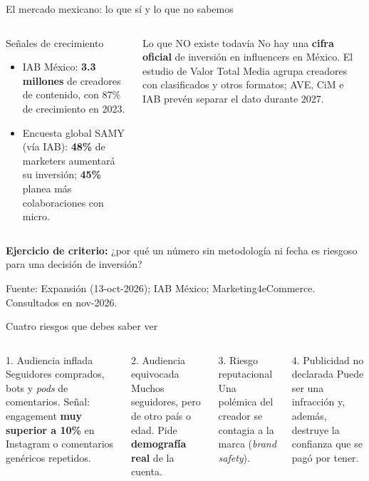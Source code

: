 \documentclass[aspectratio=169,xcolor=dvipsnames]{beamer}
\newcommand{\fuente}[1]{{\tiny\color{IPNgris}Fuente: #1}}
\begin{document}
\begin{frame}{El mercado mexicano: lo que sí y lo que no sabemos}
\begin{columns}[T]
  \begin{block}{Señales de crecimiento}
    \small
    \begin{itemize}
      \item IAB México: \textbf{3.3 millones} de creadores de contenido, con 87\% de crecimiento en 2023.
      \item Encuesta global SAMY (vía IAB): \textbf{48\%} de marketers aumentará su inversión; \textbf{45\%} planea más colaboraciones con micro.
    \end{itemize}
  \end{block}
  \begin{alertblock}{Lo que NO existe todavía}
    \small No hay una \textbf{cifra oficial} de inversión en influencers en México. El estudio de Valor Total Media agrupa creadores con clasificados y otros formatos; AVE, CiM e IAB prevén separar el dato durante 2027.
  \end{alertblock}
\end{columns}
\vspace{4pt}
\begin{center}\small \textbf{Ejercicio de criterio:} ¿por qué un número sin metodología ni fecha es riesgoso para una decisión de inversión?\end{center}
\fuente{Expansión (13-oct-2026); IAB México; Marketing4eCommerce. Consultados en nov-2026.}
\end{frame}

\begin{frame}{Cuatro riesgos que debes saber ver}
\begin{columns}[T]
  \begin{alertblock}{1. Audiencia inflada}
    \small Seguidores comprados, bots y \emph{pods} de comentarios. Señal: engagement \textbf{muy superior a 10\%} en Instagram o comentarios genéricos repetidos.
  \end{alertblock}
  \begin{block}{2. Audiencia equivocada}
    \small Muchos seguidores, pero de otro país o edad. Pide \textbf{demografía real} de la cuenta.
  \end{block}
  \begin{block}{3. Riesgo reputacional}
    \small Una polémica del creador se contagia a la marca (\emph{brand safety}).
  \end{block}
  \begin{alertblock}{4. Publicidad no declarada}
    \small Puede ser una infracción y, además, destruye la confianza que se pagó por tener.
  \end{alertblock}
\end{columns}
\end{frame}
\end{document}
